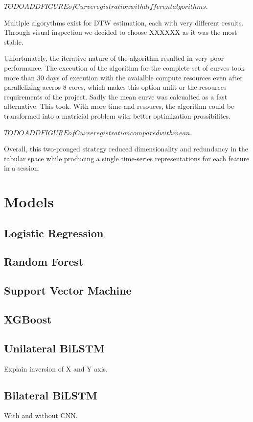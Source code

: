$TODO ADD FIGURE of Curve registration with different algorithms.$

Multiple algorythms exist for DTW estimation, each with very different results. Through visual inspection we decided to choose XXXXXX as it was the most stable.

Unfortunately, the iterative nature of the algorithm resulted in very poor performance. The execution of the algorithm for the complete set of curves took more than 30 days of execution with the avaialble compute resources even after parallelizing accros 8 cores, which makes this option unfit or the resources requirements of the project. Sadly the mean curve was calcualted as a fast alternative. This took. With more time and resouces, the algorithm could be transformed into a matricial problem with better optimization prossibilites.

$TODO ADD FIGURE of Curve registration compared with mean.$

Overall, this two-pronged strategy reduced dimensionality and redundancy in the tabular space while producing a single time-series representations for each feature in a session.


\section{Models}\label{sec:method-models}
\subsection{Logistic Regression}\label{subsec:method-baselines}
\subsection{Random Forest}\label{subsec:method-baselines}
\subsection{Support Vector Machine}\label{subsec:method-baselines}
\subsection{XGBoost}\label{subsec:method-baselines}
\subsection{Unilateral BiLSTM}\label{subsec:method-deep-learning}
Explain inversion of X and Y axis.
\subsection{Bilateral BiLSTM}\label{subsec:method-deep-learning}
With and without CNN.
